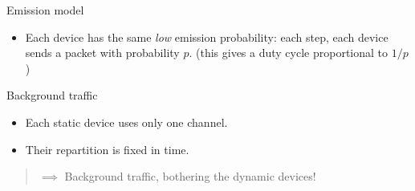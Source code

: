\begin{frameO}[Hypotheses ($1/2$)]

    \begin{colorblock}{Emission model}

        \begin{itemize}\tightlist
            \item
                  Each device has the same \emph{low} emission probability: \newline
                  each step, each device sends a packet with probability \(p\).
                  \newline
                  \hfill{}\small{(this gives a duty cycle proportional to $1/p$)}
        \end{itemize}

    \end{colorblock}

    \vspace*{20pt}

    \begin{lightcolorblock}{Background traffic}

        \begin{itemize}\tightlist
            \item
                  Each static device uses only one channel.
            \item
                  Their repartition is fixed in time.
        \end{itemize}

    \end{lightcolorblock}

    \vspace*{20pt}

    \begin{quote}
        \(\implies\) Background traffic, bothering the dynamic devices!
    \end{quote}

\end{frameO}

